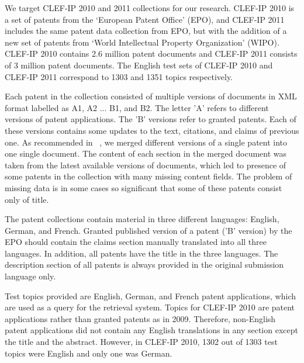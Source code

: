 We target CLEF-IP 2010 and 2011 collections for our research. CLEF-IP 2010 is a set of patents from the `European Patent Office'  (EPO), and CLEF-IP 2011 includes the same patent data collection from EPO, but with the addition of a new set of patents from `World Intellectual Property Organization' (WIPO). CLEF-IP 2010 contains 2.6 million patent documents and CLEF-IP 2011 consists of 3 million patent documents. The English test sets of CLEF-IP 2010 and CLEF-IP 2011 correspond to 1303 and 1351 topics respectively.

Each patent in the collection consisted of multiple versions of documents in XML format labelled as A1, A2 ... B1, and B2. The letter 'A' refers to different versions of patent applications. The 'B' versions refer to granted patents. Each of these versions contains some updates to the text, citations, and claims of previous one. As recommended in ~\citep{magdy2012toward}, we merged different versions of a single patent into one single document. The content of each section in the merged document was taken from the latest available versions of documents, which led to presence of some patents in the collection with many missing content fields. The problem of missing data is in some cases so significant that some of these patents consist only of title.

The patent collections contain material in three different languages: English, German, and French. Granted published version of a patent ('B' version) by the EPO should contain the claims section manually translated into all three languages. In addition, all patents have the title in the three languages. The description section of all patents is always provided in the original submission language only.

Test topics provided are English, German, and French patent applications, which are used as a query for the retrieval system. Topics for CLEF-IP 2010 are patent applications rather than granted patents as in 2009. Therefore, non-English patent applications did not contain any English translations in any section except the title and the abstract. However, in CLEF-IP 2010, 1302 out of 1303 test topics were English and only one was German. 

